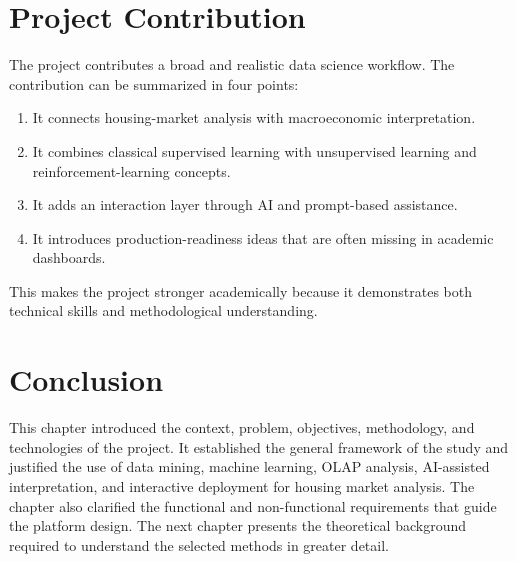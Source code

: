 \section{Project Contribution}

The project contributes a broad and realistic data science workflow. The contribution can be summarized in four points:
\begin{enumerate}
\item It connects housing-market analysis with macroeconomic interpretation.
\item It combines classical supervised learning with unsupervised learning and reinforcement-learning concepts.
\item It adds an interaction layer through AI and prompt-based assistance.
\item It introduces production-readiness ideas that are often missing in academic dashboards.
\end{enumerate}

This makes the project stronger academically because it demonstrates both technical skills and methodological understanding.

\section{Conclusion}

This chapter introduced the context, problem, objectives, methodology, and technologies of the project. It established the general framework of the study and justified the use of data mining, machine learning, OLAP analysis, AI-assisted interpretation, and interactive deployment for housing market analysis. The chapter also clarified the functional and non-functional requirements that guide the platform design. The next chapter presents the theoretical background required to understand the selected methods in greater detail.
